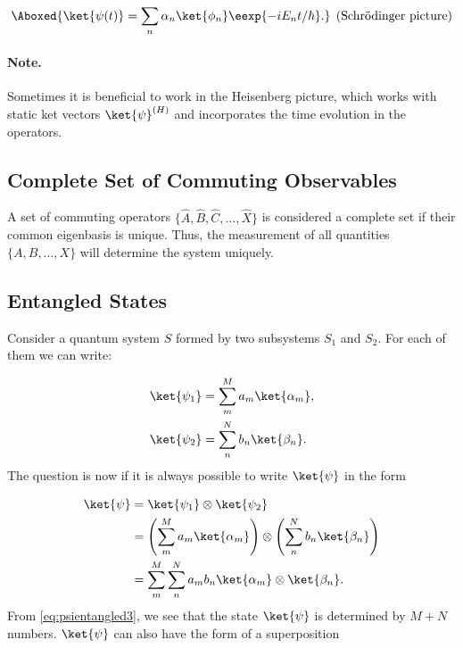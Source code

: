 \begin{align}
						\Aboxed{\ket{\psi(t)}=\sum_n\alpha_n\ket{\phi_n}\eexp{-i E_n t/\hbar}.} \;\, \text{(Schrödinger picture)}
					
\end{align}
									\paragraph{Note.} Sometimes it is beneficial to work in the Heisenberg picture, which works with static ket vectors $\ket{\psi}^{(H)}$ and incorporates the time evolution in the operators.

\subsection{Complete Set of Commuting Observables}

A set of commuting operators $\{\hat{A},\hat{B},\hat{C},\dots,\hat{X}\}$ is considered a complete set if their common eigenbasis is 				unique. Thus, the measurement of all quantities $\{A,B,\dots,X\}$ will determine the system uniquely.

\subsection{Entangled States}
 
			Consider a quantum system $S$ formed by two subsystems $S_1$ and $S_2$. For each of them we can write:

\begin{align}
				\ket{\psi_1}&=\sum_m^M a_m \ket{\alpha_m},\\
				\ket{\psi_2}&=\sum_n^N b_n \ket{\beta_n}.
			
\end{align}
			The question is now if it is always possible to write $\ket{\psi}$ in the form

\begin{align}
 \label{eq:psientangled} 
				\ket{\psi}	&=\ket{\psi_1}\otimes\ket{\psi_2}\\
							&=\left(\sum_m^M a_m \ket{\alpha_m}\right) \otimes \left(\sum_n^N b_n \ket{\beta_n}\right) \label{eq:psientangled2} \\
							&=\sum_m^M \sum_n^N a_m b_n \ket{\alpha_m} \otimes \ket{\beta_n}. \label{eq:psientangled3} 
			
\end{align}
						From \eqref{eq:psientangled3}, we see that the state $\ket{\psi}$ is determined by $M + N$ numbers. $\ket{\psi}$ can also have the form of a superposition

